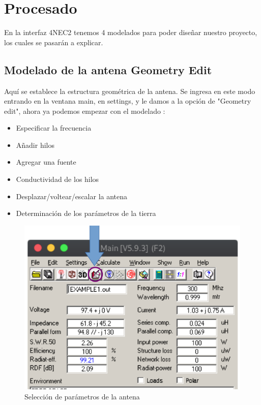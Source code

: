 \documentclass[11pt,a4paper]{article}
\begin{document}
\section{Procesado}\label{sec:3}
En la interfaz 4NEC2 tenemos 4 modelados para poder diseñar nuestro proyecto, los cuales se pasar\'an a explicar.

\subsection{Modelado de la antena Geometry Edit}\label{sec:3.1}
Aquí se establece la estructura geométrica de la antena. Se ingresa en este modo entrando en la ventana main, en settings, y le damos a la opción de "Geometry edit", ahora ya podemos empezar con el modelado :
\begin{itemize}
    \item Especificar la frecuencia
    \item Añadir hilos
    \item Agregar una fuente
    \item Conductividad de los hilos
    \item Desplazar/voltear/escalar la antena
    \item Determinación de los parámetros de la tierra
\end{itemize}

\begin{figure}[H]
    \centering
    \includegraphics[scale=0.35]{images/Procesado/main2.png}
    \caption{Selección de par\'ametros de la antena}
    \label{fig4:parametros}
\end{figure}
\end{document}
